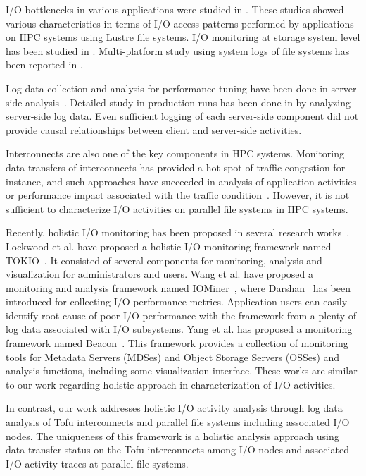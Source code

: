 \documentclass{jhps}
\begin{document}
I/O bottlenecks in various applications were studied in \cite{xie:sc12,saini:hipc12}.
These studies showed various characteristics in terms of I/O access patterns performed
by applications on HPC systems using Lustre file systems.
I/O monitoring at storage system level has been studied
in \cite{isc14:kunkel,uselton:cug13,madireddy:nas17}.
Multi-platform study using system logs of file systems has been reported
in \cite{luu:HPDC2015}.

Log data collection and analysis for performance tuning have been done in
server-side analysis~\cite{liu:fast2014,liu:sc16,xu:cug16}.
Detailed study in production runs has been done in \cite{patel:sc19}
by analyzing server-side log data.
Even sufficient logging of each server-side component did not provide causal relationships
between client and server-side activities.

Interconnects are also one of the key components in HPC systems. Monitoring data transfers of
interconnects has provided a hot-spot of traffic congestion for instance,
and such approaches have succeeded in analysis of application activities
or performance impact associated with
the traffic condition~\cite{zimmer:cug16,kumar:DSN2018,chunduri:pmbs19}.
However, it is not sufficient to characterize I/O activities on parallel file systems
in HPC systems.

Recently, holistic I/O monitoring has been proposed
in several research works~\cite{lockwood:cug18,wang:cluster18,yang:nsdi2019}.
Lockwood et al. have proposed a holistic I/O monitoring framework
named TOKIO~\cite{lockwood:cug18}.
It consisted of several components for monitoring, analysis and visualization
for administrators and users.
Wang et al. have proposed a monitoring and analysis framework
named IOMiner~\cite{wang:cluster18}, where Darshan~\cite{darshan:web}
has been introduced for collecting I/O performance metrics.
Application users can easily identify root cause of
poor I/O performance with the framework from a plenty of log data
associated with I/O subsystems.
Yang et al. has proposed a monitoring framework
named Beacon~\cite{yang:nsdi2019}.
This framework provides a collection of monitoring tools for Metadata Servers (MDSes)
and Object Storage Servers (OSSes) and analysis functions,
including some visualization interface. These works are similar to our work regarding
holistic approach in characterization of I/O activities.

In contrast, our work addresses holistic I/O activity analysis
through log data analysis of Tofu interconnects and parallel file systems
including associated I/O nodes.
The uniqueness of this framework is a holistic analysis approach
using data transfer status on the Tofu interconnects among I/O nodes
and associated I/O activity traces at parallel file systems.
\end{document}
